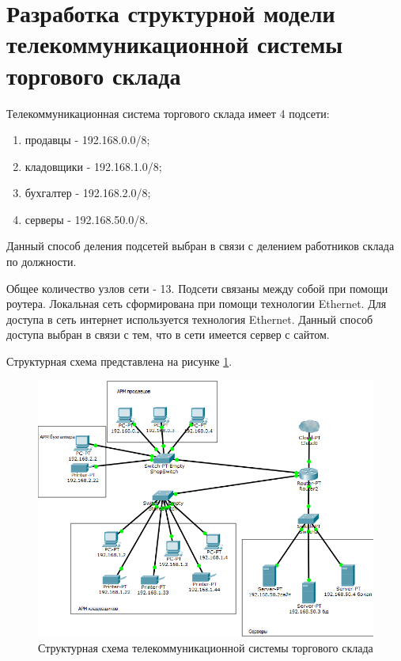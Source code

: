 \section{Разработка структурной модели телекоммуникационной системы торгового склада}
\label{sec:2}

Телекоммуникационная система торгового склада имеет 4 подсети:
\begin{enumerate}
\item продавцы \hyp{} 192.168.0.0/8;
\item кладовщики \hyp{} 192.168.1.0/8;
\item бухгалтер \hyp{} 192.168.2.0/8;
\item серверы \hyp{} 192.168.50.0/8.
\end{enumerate}

Данный способ деления подсетей выбран в связи с делением работников склада по должности.

Общее количество узлов сети \hyp{} 13. Подсети связаны между собой при помощи роутера. Локальная сеть сформирована при помощи технологии Ethernet. Для доступа в сеть интернет используется технология Ethernet. Данный способ доступа выбран в связи с тем, что в сети имеется сервер с сайтом.

Структурная схема представлена на рисунке \ref{fig:struct}.
\begin{figure}[H]
  \centering
  \includegraphics[width=\linewidth]{sec2/img/struct.png}
  \caption{Структурная схема телекоммуникационной системы торгового склада}
  \label{fig:struct}
\end{figure}
